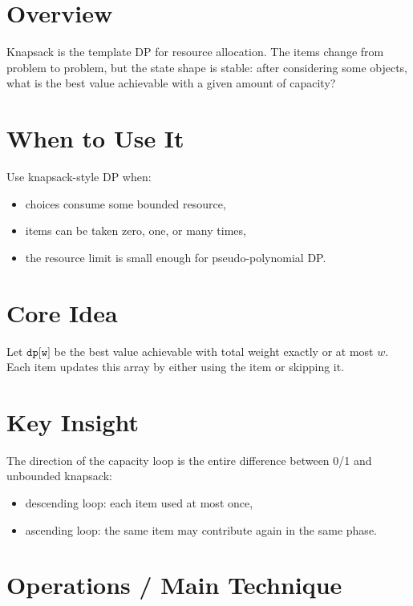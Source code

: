 \section*{Overview}

Knapsack is the template DP for resource allocation. The items change from problem to problem, but the state shape is
stable: after considering some objects, what is the best value achievable with a given amount of capacity?

\section*{When to Use It}

Use knapsack-style DP when:

\begin{itemize}
  \item choices consume some bounded resource,
  \item items can be taken zero, one, or many times,
  \item the resource limit is small enough for pseudo-polynomial DP.
\end{itemize}

\section*{Core Idea}

Let \(\texttt{dp[w]}\) be the best value achievable with total weight exactly or at most \(w\). Each item updates this
array by either using the item or skipping it.

\section*{Key Insight}

The direction of the capacity loop is the entire difference between 0/1 and unbounded knapsack:

\begin{itemize}
  \item descending loop: each item used at most once,
  \item ascending loop: the same item may contribute again in the same phase.
\end{itemize}

\section*{Operations / Main Technique}

